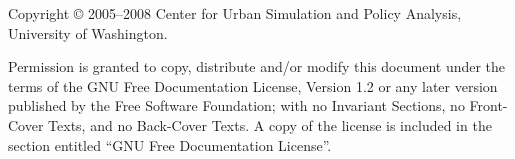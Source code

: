 
Copyright \copyright{} 2005--2008
Center for Urban Simulation and Policy Analysis,
University of Washington.  

Permission is granted to copy, distribute and/or
modify this document under the terms of the GNU Free Documentation License,
Version 1.2 or any later version published by the Free Software Foundation;
with no Invariant Sections, no Front-Cover Texts, and no Back-Cover Texts.
A copy of the license is included in the section entitled ``GNU Free
Documentation License''.

